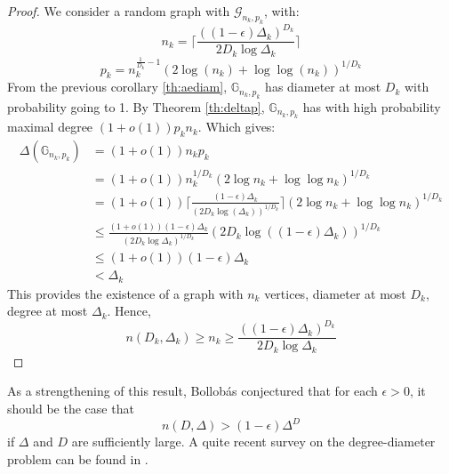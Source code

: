 \begin{proof}
	We consider a random graph with $\mathcal{G}_{n_k, p_k}$, with:
	\begin{equation}
		n_k = \lceil \frac{((1-\epsilon)\Delta_k)^{D_k}}{2D_k\log \Delta_k} \rceil
	\end{equation}
	\begin{equation}
		p_k = n_k^{\frac{1}{D_k} -1 }(2\log(n_k) + \log\log(n_k))^{1/D_k}
	\end{equation}
	From the previous corollary \eqref{th:aediam}, $\mathbb{G}_{n_k, p_k}$ has diameter at most $D_k$ with probability going to 1.
	By Theorem \eqref{th:deltap}, $\mathbb{G}_{n_k,p_k}$ has with high probability maximal degree $(1+o(1))p_kn_k$.
	Which gives:
	\begin{align}
		\Delta(\mathbb{G}_{n_k,p_k}) 	&=(1+o(1))n_kp_k \\
						&= (1+o(1))n_k^{1/D_k}(2\log n_k + \log\log n_k)^{1/D_k}	\\
						&= (1+o(1))\lceil{\frac{(1-\epsilon)\Delta_k}{(2D_k\log(\Delta_k))^{1/D_k}}}\rceil(2\log n_k +  \log\log n_k)^{1/D_k}\\	
						&\leq \frac{(1+o(1))(1-\epsilon) \Delta_k}{(2D_k \log\Delta_k)^{1/D_k}} (2D_k\log((1-\epsilon)\Delta_k))^{1/D_k} \\   
						&\leq (1+o(1))(1-\epsilon)\Delta_k \\
						&< \Delta_k	
	\end{align}	
	This provides the existence of a graph with $n_k$ vertices, diameter at most $D_k$, degree at most $\Delta_k$.
	Hence,
	\begin{equation}
		n(D_k, \Delta_k)\geq n_k \geq \frac{((1-\epsilon)\Delta_k)^{D_k}}{2D_k\log \Delta_k} 
	\end{equation}
\end{proof}
As a strengthening of this result, Bollob\'as \cite{BollobExtr} conjectured that for each $\epsilon > 0$, it should be the case that $$n(D, \Delta) > (1-\epsilon)\Delta^D$$ if $\Delta$ and $D$ are sufficiently large.
\newline
A quite recent survey on the degree-diameter problem can be found in \cite{degreeDiam}.

